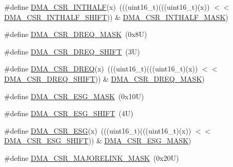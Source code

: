 \begin{DoxyCompactItemize}
\item 
\#define \mbox{\hyperlink{group___d_m_a___register___masks_ga9a8d521afcd31c2eec47dca10971eb76}{D\+M\+A\+\_\+\+C\+S\+R\+\_\+\+I\+N\+T\+H\+A\+LF}}(x)~(((uint16\+\_\+t)(((uint16\+\_\+t)(x)) $<$$<$ \mbox{\hyperlink{group___d_m_a___register___masks_ga72ab8889d41c8ab88cea74dcb81d0f00}{D\+M\+A\+\_\+\+C\+S\+R\+\_\+\+I\+N\+T\+H\+A\+L\+F\+\_\+\+S\+H\+I\+FT}})) \& \mbox{\hyperlink{group___d_m_a___register___masks_ga65d795eca7173289b56fc862abbf6703}{D\+M\+A\+\_\+\+C\+S\+R\+\_\+\+I\+N\+T\+H\+A\+L\+F\+\_\+\+M\+A\+SK}})
\item 
\#define \mbox{\hyperlink{group___d_m_a___register___masks_ga5c490f9434d06e1bf11f5d5701dd546e}{D\+M\+A\+\_\+\+C\+S\+R\+\_\+\+D\+R\+E\+Q\+\_\+\+M\+A\+SK}}~(0x8\+U)
\item 
\#define \mbox{\hyperlink{group___d_m_a___register___masks_ga5932e5b14fcfbde57315d875dc3288fd}{D\+M\+A\+\_\+\+C\+S\+R\+\_\+\+D\+R\+E\+Q\+\_\+\+S\+H\+I\+FT}}~(3\+U)
\item 
\#define \mbox{\hyperlink{group___d_m_a___register___masks_gad12e18848970d071c8cf82ff61030f90}{D\+M\+A\+\_\+\+C\+S\+R\+\_\+\+D\+R\+EQ}}(x)~(((uint16\+\_\+t)(((uint16\+\_\+t)(x)) $<$$<$ \mbox{\hyperlink{group___d_m_a___register___masks_ga5932e5b14fcfbde57315d875dc3288fd}{D\+M\+A\+\_\+\+C\+S\+R\+\_\+\+D\+R\+E\+Q\+\_\+\+S\+H\+I\+FT}})) \& \mbox{\hyperlink{group___d_m_a___register___masks_ga5c490f9434d06e1bf11f5d5701dd546e}{D\+M\+A\+\_\+\+C\+S\+R\+\_\+\+D\+R\+E\+Q\+\_\+\+M\+A\+SK}})
\item 
\#define \mbox{\hyperlink{group___d_m_a___register___masks_ga58c5b388126424c012533eec1020e15d}{D\+M\+A\+\_\+\+C\+S\+R\+\_\+\+E\+S\+G\+\_\+\+M\+A\+SK}}~(0x10\+U)
\item 
\#define \mbox{\hyperlink{group___d_m_a___register___masks_gaac36360d5090fc436e557ad8859046c4}{D\+M\+A\+\_\+\+C\+S\+R\+\_\+\+E\+S\+G\+\_\+\+S\+H\+I\+FT}}~(4\+U)
\item 
\#define \mbox{\hyperlink{group___d_m_a___register___masks_ga7b00c35b778f76a80485ed53f4a0402f}{D\+M\+A\+\_\+\+C\+S\+R\+\_\+\+E\+SG}}(x)~(((uint16\+\_\+t)(((uint16\+\_\+t)(x)) $<$$<$ \mbox{\hyperlink{group___d_m_a___register___masks_gaac36360d5090fc436e557ad8859046c4}{D\+M\+A\+\_\+\+C\+S\+R\+\_\+\+E\+S\+G\+\_\+\+S\+H\+I\+FT}})) \& \mbox{\hyperlink{group___d_m_a___register___masks_ga58c5b388126424c012533eec1020e15d}{D\+M\+A\+\_\+\+C\+S\+R\+\_\+\+E\+S\+G\+\_\+\+M\+A\+SK}})
\item 
\#define \mbox{\hyperlink{group___d_m_a___register___masks_gaeb6466fd98e1ae2a8f7a682124192b97}{D\+M\+A\+\_\+\+C\+S\+R\+\_\+\+M\+A\+J\+O\+R\+E\+L\+I\+N\+K\+\_\+\+M\+A\+SK}}~(0x20\+U)
$$
\end{DoxyCompactItemize}

